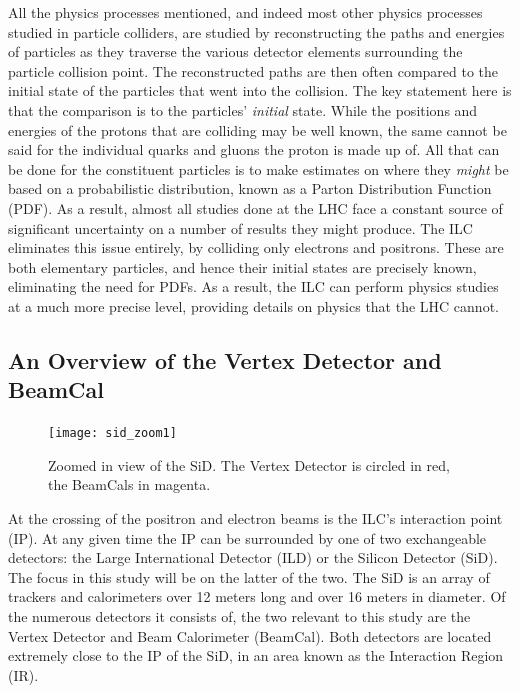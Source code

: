 \documentclass{report}
\begin{document}
                All the physics processes mentioned, and indeed most other physics processes studied in particle colliders, are studied by reconstructing the paths and energies of particles as they traverse the various detector elements surrounding the particle collision point. The reconstructed paths are then often compared to the initial state of the particles that went into the collision. The key statement here is that the comparison is to the particles' \textit{initial} state. While the positions and energies of the protons that are colliding may be well known, the same cannot be said for the individual quarks and gluons the proton is made up of. All that can be done for the constituent particles is to make estimates on where they \textit{might} be based on a probabilistic distribution, known as a Parton Distribution Function (PDF). As a result, almost all studies done at the LHC face a constant source of significant uncertainty on a number of results they might produce. The ILC eliminates this issue entirely, by colliding only electrons and positrons. These are both elementary particles, and hence their initial states are precisely known, eliminating the need for PDFs. As a result, the ILC can perform physics studies at a much more precise level, providing details on physics that the LHC cannot.

            \subsection{An Overview of the Vertex Detector and BeamCal}
                \begin{figure}[h] 
                    \texttt{[image: sid\_zoom1]}
                    \centering
                    \caption{Zoomed in view of the SiD.
                        The Vertex Detector is circled in red,
                        the BeamCals in magenta.}
                    \label{fig:sid_zoom1}
                \end{figure}

                At the crossing of the positron and electron beams is the ILC's interaction point (IP). At any given time the IP can be surrounded by one of two exchangeable detectors: the Large International Detector (ILD) or the Silicon Detector (SiD). The focus in this study will be on the latter of the two. The SiD is an array of trackers and calorimeters over 12 meters long and over 16 meters in diameter. Of the numerous detectors it consists of, the two relevant to this study are the Vertex Detector and Beam Calorimeter (BeamCal). Both detectors are located extremely close to the IP of the SiD, in an area known as the Interaction Region (IR). 
\end{document}

